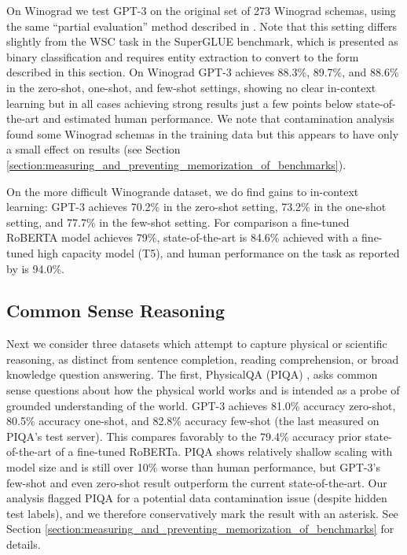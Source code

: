 On Winograd we test GPT-3 on the original set of 273 Winograd schemas, using the same ``partial evaluation'' method described in \cite{radford2019language}.  Note that this setting differs slightly from the WSC task in the SuperGLUE benchmark, which is presented as binary classification and requires entity extraction to convert to the form described in this section.  On Winograd GPT-3 achieves 88.3\%, 89.7\%, and 88.6\% in the zero-shot, one-shot, and few-shot settings, showing no clear in-context learning but in all cases achieving strong results just a few points below state-of-the-art and estimated human performance.  We note that contamination analysis found some Winograd schemas in the training data but this appears to have only a small effect on results (see Section \ref{section:measuring_and_preventing_memorization_of_benchmarks}).

On the more difficult Winogrande dataset, we do find gains to in-context learning: GPT-3 achieves 70.2\% in the zero-shot setting, 73.2\% in the one-shot setting, and 77.7\% in the few-shot setting.  For comparison a fine-tuned RoBERTA model achieves 79\%, state-of-the-art is 84.6\% achieved with a fine-tuned high capacity model (T5), and human performance on the task as reported by \cite{sakaguchi2019winogrande} is 94.0\%.

    \subsection{Common Sense Reasoning}
    \label{section:Common_Sense_Reasoning}

Next we consider three datasets which attempt to capture physical or scientific reasoning, as distinct from sentence completion, reading comprehension, or broad knowledge question answering. The first, PhysicalQA (PIQA) \cite{bisk2019piqa}, asks common sense questions about how the physical world works and is intended as a probe of grounded understanding of the world. GPT-3 achieves 81.0\% accuracy zero-shot, 80.5\% accuracy one-shot, and 82.8\% accuracy few-shot (the last measured on PIQA's test server).  This compares favorably to the 79.4\% accuracy prior state-of-the-art of a fine-tuned RoBERTa. PIQA shows relatively shallow scaling with model size and is still over 10\% worse than human performance, but GPT-3's few-shot and even zero-shot result outperform the current state-of-the-art.  Our analysis flagged PIQA for a potential data contamination issue (despite hidden test labels), and we therefore conservatively mark the result with an asterisk. See Section \ref{section:measuring_and_preventing_memorization_of_benchmarks} for details.

